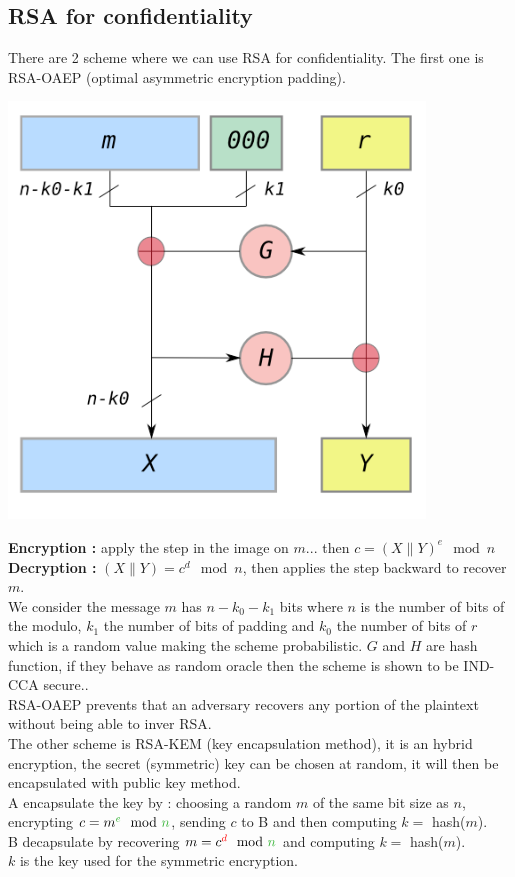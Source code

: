 \documentclass[11pt,a4paper]{report}
\begin{document}
\subsection{RSA for confidentiality}
There are 2 scheme where we can use RSA for confidentiality. The first one is RSA-OAEP (optimal asymmetric encryption padding). 
\begin{center}
\includegraphics[scale=0.5]{img/img33.png}
\end{center}
\textbf{Encryption :} apply the step in the image on $m...$ then $c = (X\parallel Y)^e \mod n$\\
\textbf{Decryption :} $(X \parallel Y) = c^d \mod n$, then applies the step backward to recover $m$.\\
We consider the message $m$ has $n - k_0 - k_1$ bits where $n$ is the number of bits of the modulo, $k_1$ the number of bits of padding and $k_0$ the number of bits of $r$ which is a random value making the scheme probabilistic. $G$ and $H$ are hash function, if they behave as random oracle then the scheme is shown to be IND-CCA secure..\\
RSA-OAEP prevents that an adversary recovers any portion of the plaintext without being able to inver RSA.\\

The other scheme is RSA-KEM (key encapsulation method), it is an hybrid encryption, the secret (symmetric) key can be chosen at random, it will then be encapsulated with public key method.\\ 
A encapsulate the key by : choosing a random $m$ of the same bit size as \textcolor{ao}{$n$}, encrypting $c = m^{\textcolor{ao}{e}} \mod \textcolor{ao}{n}$, sending $c$ to B and then computing $k =$ hash($m$).\\
B decapsulate by recovering $m = c^{\textcolor{red}{d}} \mod \textcolor{ao}{n}$ and computing $k =$ hash($m$).\\
$k$ is the key used for the symmetric encryption.
\end{document}
